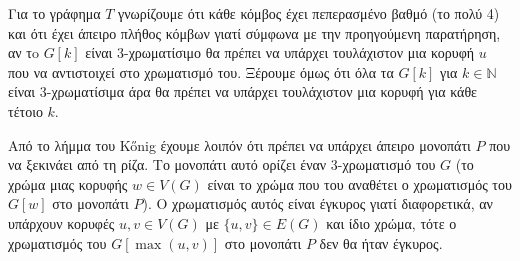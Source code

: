 \documentclass[a4paper, oneside, 11pt]{article}
\theoremstyle{definition}
\begin{document}
\begin{enumerate}
   Για το γράφημα $T$ γνωρίζουμε ότι κάθε κόμβος έχει πεπερασμένο βαθμό
   (το πολύ 4) και ότι έχει άπειρο πλήθος κόμβων γιατί σύμφωνα με την
   προηγούμενη παρατήρηση, αν τo $G[k]$ είναι 3-χρωματίσιμο θα πρέπει
   να υπάρχει τουλάχιστον μια κορυφή $u$ που να αντιστοιχεί στο
   χρωματισμό του. Ξέρουμε όμως ότι όλα τα $G[k]$ για $k \in \mathbb{N}$
   είναι 3-χρωματίσιμα άρα θα πρέπει να υπάρχει τουλάχιστον μια κορυφή
   για κάθε τέτοιο $k$.

   Από το λήμμα του K\H{o}nig έχουμε λοιπόν ότι πρέπει να υπάρχει άπειρο
   μονοπάτι $P$ που να ξεκινάει από τη ρίζα. Το μονοπάτι αυτό ορίζει
   έναν 3-χρωματισμό του $G$ (το χρώμα μιας κορυφής $w \in V(G)$
   είναι το χρώμα που του αναθέτει ο χρωματισμός του $G[w]$ στο μονοπάτι
   $P$). O χρωματισμός αυτός είναι έγκυρος γιατί διαφορετικά, αν υπάρχουν
   κορυφές $u, v \in V(G)$ με $\{u, v\} \in E(G)$ και ίδιο χρώμα, τότε
   ο χρωματισμός του $G[\max(u, v)]$ στο μονοπάτι $P$ δεν θα ήταν έγκυρος.
\end{enumerate}
\end{document}
